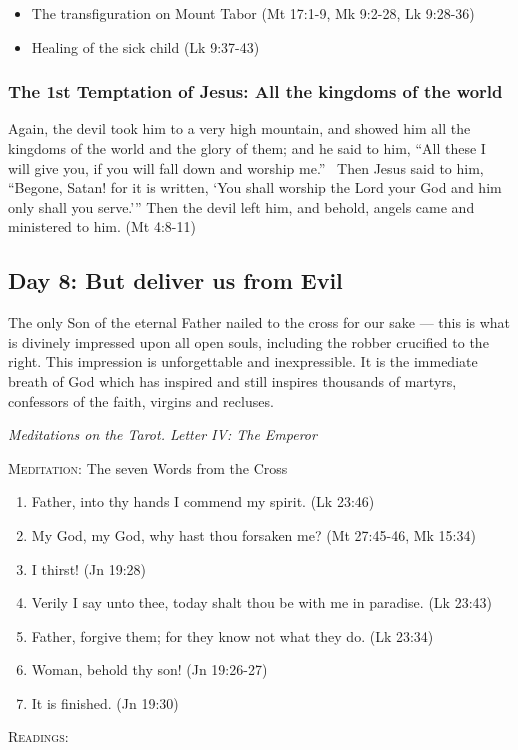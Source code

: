 \begin{itemize}
\item The transfiguration on Mount Tabor (Mt 17:1-9, Mk 9:2-28, Lk 9:28-36) 
\item Healing of the sick child (Lk 9:37-43) 
\end{itemize}
\subsubsection*{The 1st Temptation of Jesus: All the kingdoms of the world}
Again, the devil took him to a very high mountain, and showed him all the kingdoms of the world and the glory of them;
and he said to him, “All these I will give you, if you will fall down and worship me.”  Then Jesus said to him,
“Begone, Satan! for it is written, `You shall worship the Lord your God and him only shall you
serve.'” Then the devil left him, and behold, angels came and ministered to him. (Mt 4:8-11)

\subsection*{Day 8: But deliver us from Evil}
\begin{quotationx}
The only Son of the eternal Father nailed to the cross for our sake — this is what is divinely
impressed upon all open souls, including the robber crucified to the right. This impression is unforgettable and
inexpressible. It is the immediate breath of God which has inspired and still inspires thousands of martyrs, confessors
of the faith, virgins and recluses. 

\begin{flushright}\textit{Meditations on the Tarot. Letter IV: The Emperor}\end{flushright}

\end{quotationx}
\textsc{Meditation}: The seven Words from the Cross

\begin{enumerate}
\item Father, into thy hands I commend my spirit. (Lk 23:46) 
\item My God, my God, why hast thou forsaken me? (Mt 27:45-46, Mk 15:34) 
\item I thirst! (Jn 19:28) 
\item Verily I say unto thee, today shalt thou be with me in paradise. (Lk 23:43) 
\item Father, forgive them; for they know not what they do. (Lk 23:34) 
\item Woman, behold thy son! (Jn 19:26-27) 
\item It is finished. (Jn 19:30) 
\end{enumerate}
\textsc{Readings}:


